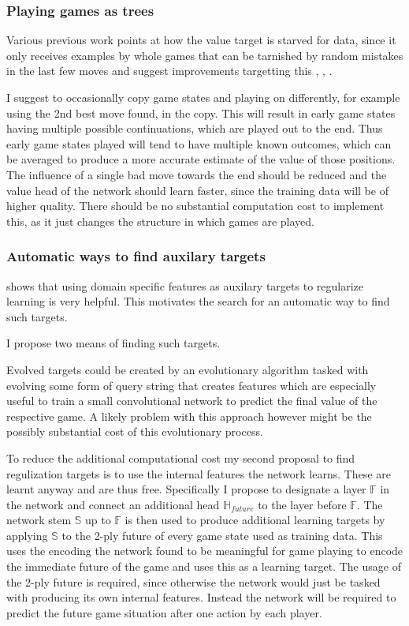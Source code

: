 \documentclass[12pt,onecolumn,oneside,titlepage]{article}
\begin{document}
\subsubsection{Playing games as trees}

Various previous work points at how the value target is starved for data, since it only receives examples by whole games that can be tarnished by random mistakes in the last few moves and suggest improvements targetting this \cite{wu2019accelerating}, \cite{oracledevs6}, \cite{lan2019multiple}.

I suggest to occasionally copy game states and playing on differently, for example using the 2nd best move found, in the copy.
This will result in early game states having multiple possible continuations, which are played out to the end. Thus early game states played will tend to have multiple known outcomes,
which can be averaged to produce a more accurate estimate of the value of those positions. The influence of a single bad move towards the end should be reduced and the value head of the network should learn faster, since the training data will be of higher quality.
There should be no substantial computation cost to implement this, as it just changes the structure in which games are played.

\subsubsection{Automatic ways to find auxilary targets}

\cite{wu2019accelerating} shows that using domain specific features as auxilary targets to regularize learning is very helpful. This motivates the search for an automatic way to find such targets.

I propose two means of finding such targets.

Evolved targets could be created by an evolutionary algorithm tasked with evolving some form of query string that creates features which are especially useful to train a small convolutional network to predict the final value of the respective game.
A likely problem with this approach however might be the possibly substantial cost of this evolutionary process.

To reduce the additional computational cost my second proposal to find regulization targets is to use the internal features the network learns. These are learnt anyway and are thus free.
Specifically I propose to designate a layer $\mathbb{F}$ in the network and connect an additional head $\mathbb{H}_{future}$ to the layer before $\mathbb{F}$. 
The network stem $\mathbb{S}$ up to $\mathbb{F}$ is then used to produce additional learning targets by applying $\mathbb{S}$ to the 2-ply future of every game state used as training data.
This uses the encoding the network found to be meaningful for game playing to encode the immediate future of the game and uses this as a learning target. The usage of the 2-ply future is required, since otherwise the network would just be tasked with producing
its own internal features. Instead the network will be required to predict the future game situation after one action by each player.
\end{document}
